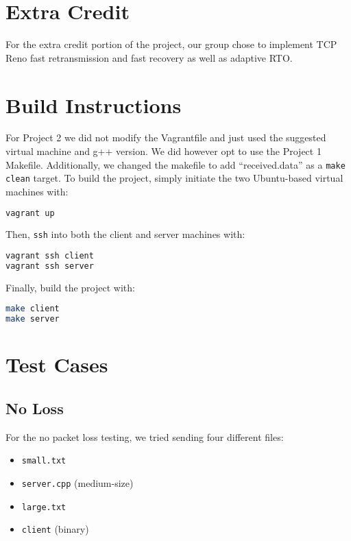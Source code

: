 \documentclass{article}
\begin{document}
\section{Extra Credit}

For the extra credit portion of the project, our group chose to implement TCP Reno fast retransmission and fast recovery as well as adaptive RTO.

\section{Build Instructions}

For Project 2 we did not modify the Vagrantfile and just used the suggested virtual machine and g++ version. We did however opt to use the Project 1 Makefile. Additionally, we changed the makefile to add ``received.data'' as a \texttt{make clean} target. To build the project, simply initiate the two Ubuntu-based virtual machines with:

\begin{lstlisting}[language=bash]
vagrant up
\end{lstlisting} 

\noindent
Then, \texttt{ssh} into both the client and server machines with:

\begin{lstlisting}[language=bash]
vagrant ssh client
vagrant ssh server
\end{lstlisting} 

\noindent
Finally, build the project with:

\begin{lstlisting}[language=bash]
make client
make server
\end{lstlisting}

\section{Test Cases}

\subsection{No Loss}

For the no packet loss testing, we tried sending four different files:

\begin{itemize}
	\item \texttt{small.txt}
	\item \texttt{server.cpp} (medium-size)
	\item \texttt{large.txt}
	\item \texttt{client} (binary)
\end{itemize}
\end{document}
